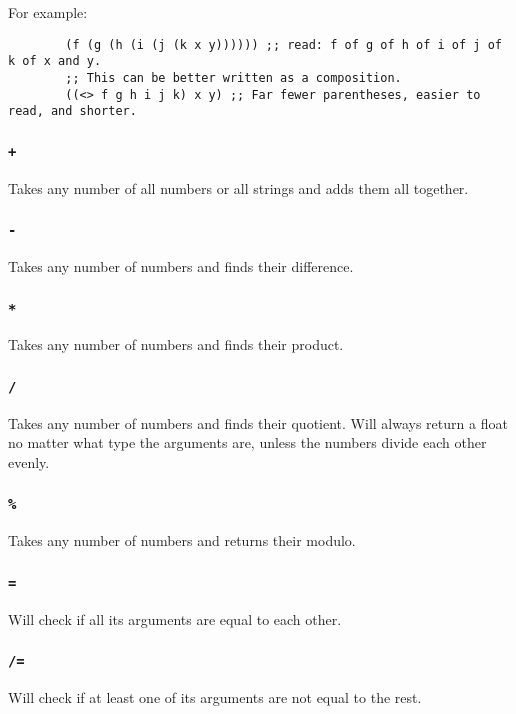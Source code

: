 \documentclass{article}
\newcommand{\code}[1]{\texttt{#1}}
\begin{document}
      For example:
      \begin{verbatim}
        (f (g (h (i (j (k x y)))))) ;; read: f of g of h of i of j of k of x and y.
        ;; This can be better written as a composition.
        ((<> f g h i j k) x y) ;; Far fewer parentheses, easier to read, and shorter.
      \end{verbatim}

    \subsubsection{\code{+}}
      Takes any number of all numbers or all strings and adds
      them all together.

    \subsubsection{\code{-}}
      Takes any number of numbers and finds their difference.

    \subsubsection{\code{*}}
      Takes any number of numbers and finds their product.

    \subsubsection{\code{/}}
      Takes any number of numbers and finds their quotient.
      Will always return a float no matter what type the arguments are,
      unless the numbers divide each other evenly.

    \subsubsection{\code{\%}}
      Takes any number of numbers and returns their modulo.

    \subsubsection{\code{=}}
      Will check if all its arguments are equal to each other.

    \subsubsection{\code{/=}}
      Will check if at least one of its arguments are not equal
      to the rest.
\end{document}

